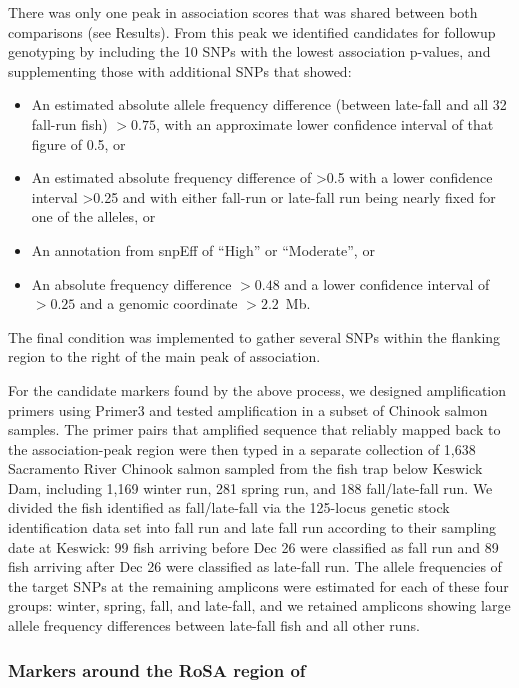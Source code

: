 There was only one peak in association scores that was shared between both comparisons (see 
Results). From this peak we identified candidates for followup genotyping by including the 10 
SNPs with the lowest association p-values, and supplementing those with additional SNPs that 
showed:
\begin{itemize}
\item An estimated absolute allele frequency difference (between late-fall and all 32 fall-run fish)  $>0.75$,  with an approximate lower confidence interval of that figure of 0.5,  or
\item An estimated absolute frequency difference of >0.5 with a lower confidence interval >0.25 and 
with either fall-run or late-fall run being nearly fixed for one of the alleles, or
\item An annotation from snpEff \citep{cingolani2012program} of “High” or “Moderate”, or
\item An absolute frequency difference $>0.48$ and a lower confidence interval of $>0.25$ and a 
genomic  coordinate $> 2.2$~Mb.
\end{itemize}
The final condition was implemented to gather several SNPs within the flanking region to the right of 
the main peak of association. 

For the candidate markers found by the above process, we designed amplification primers using 
Primer3 \citep{koressaar2007enhancements,untergasser2012primer3} and tested amplification in a 
subset of Chinook salmon 
samples. The primer pairs that amplified sequence that reliably mapped back to the association-peak region were then typed
in a separate collection of 1,638 Sacramento River Chinook salmon sampled from the fish trap below Keswick Dam, including 1,169 winter run, 281 spring 
run, and 188 fall/late-fall run. We divided the fish identified as fall/late-fall via the 125-locus genetic 
stock identification data set into fall run and late fall run according to their sampling date at Keswick: 
99 fish arriving before Dec 26 were classified as fall run and 89 fish arriving after Dec 26 were 
classified as late-fall run.   The allele frequencies of the target SNPs at the remaining amplicons 
were 
estimated for each of these four groups: winter, spring, fall, and late-fall, and we retained
amplicons showing large allele frequency  differences between late-fall fish and all other runs.


\subsubsection*{Markers around the RoSA region of \citet{thompson2020complex}}

